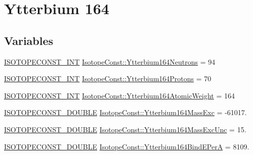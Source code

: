 \hypertarget{group___isotope_const-_ytterbium-_yb164}{}\section{Ytterbium 164}
\label{group___isotope_const-_ytterbium-_yb164}
\subsection*{Variables}
\begin{DoxyCompactItemize}
\item 
\mbox{\hyperlink{group___isotope_const-_macros_ga5f18360b3e99483a35c32d789e62621c}{I\+S\+O\+T\+O\+P\+E\+C\+O\+N\+S\+T\+\_\+\+I\+NT}} \mbox{\hyperlink{group___isotope_const-_ytterbium-_yb164_ga5ae421c9784bcf0eb3455001b6afebdb}{Isotope\+Const\+::\+Ytterbium164\+Neutrons}} = 94
\item 
\mbox{\hyperlink{group___isotope_const-_macros_ga5f18360b3e99483a35c32d789e62621c}{I\+S\+O\+T\+O\+P\+E\+C\+O\+N\+S\+T\+\_\+\+I\+NT}} \mbox{\hyperlink{group___isotope_const-_ytterbium-_yb164_ga3eb1e6402e8a1c664640dc2f162842f9}{Isotope\+Const\+::\+Ytterbium164\+Protons}} = 70
\item 
\mbox{\hyperlink{group___isotope_const-_macros_ga5f18360b3e99483a35c32d789e62621c}{I\+S\+O\+T\+O\+P\+E\+C\+O\+N\+S\+T\+\_\+\+I\+NT}} \mbox{\hyperlink{group___isotope_const-_ytterbium-_yb164_ga1fff978e5fee1405597848121574fdfa}{Isotope\+Const\+::\+Ytterbium164\+Atomic\+Weight}} = 164
\item 
\mbox{\hyperlink{group___isotope_const-_macros_ga8f45a7272ce02c0b4c65c44636ed719a}{I\+S\+O\+T\+O\+P\+E\+C\+O\+N\+S\+T\+\_\+\+D\+O\+U\+B\+LE}} \mbox{\hyperlink{group___isotope_const-_ytterbium-_yb164_gaf150b84019e022a0ee9f5a9209da4741}{Isotope\+Const\+::\+Ytterbium164\+Mass\+Exc}} = -\/61017.
\item 
\mbox{\hyperlink{group___isotope_const-_macros_ga8f45a7272ce02c0b4c65c44636ed719a}{I\+S\+O\+T\+O\+P\+E\+C\+O\+N\+S\+T\+\_\+\+D\+O\+U\+B\+LE}} \mbox{\hyperlink{group___isotope_const-_ytterbium-_yb164_ga009aaa94a39851b186cbf7c27d873c53}{Isotope\+Const\+::\+Ytterbium164\+Mass\+Exc\+Unc}} = 15.
\item 
\mbox{\hyperlink{group___isotope_const-_macros_ga8f45a7272ce02c0b4c65c44636ed719a}{I\+S\+O\+T\+O\+P\+E\+C\+O\+N\+S\+T\+\_\+\+D\+O\+U\+B\+LE}} \mbox{\hyperlink{group___isotope_const-_ytterbium-_yb164_ga72f5e148e742bde856fd8c7605481703}{Isotope\+Const\+::\+Ytterbium164\+Bind\+E\+PerA}} = 8109.
\item 

\end{DoxyCompactItemize}
